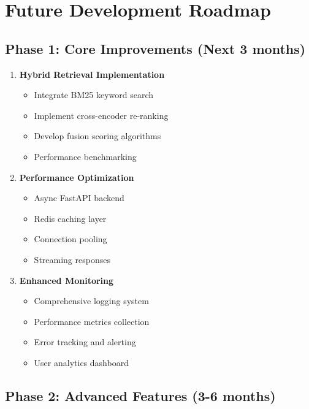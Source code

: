 \documentclass[12pt,a4paper]{article}
\begin{document}
\section{Future Development Roadmap}

\subsection{Phase 1: Core Improvements (Next 3 months)}

\begin{enumerate}
    \item \textbf{Hybrid Retrieval Implementation}
    \begin{itemize}
        \item Integrate BM25 keyword search
        \item Implement cross-encoder re-ranking
        \item Develop fusion scoring algorithms
        \item Performance benchmarking
    \end{itemize}
    
    \item \textbf{Performance Optimization}
    \begin{itemize}
        \item Async FastAPI backend
        \item Redis caching layer
        \item Connection pooling
        \item Streaming responses
    \end{itemize}
    
    \item \textbf{Enhanced Monitoring}
    \begin{itemize}
        \item Comprehensive logging system
        \item Performance metrics collection
        \item Error tracking and alerting
        \item User analytics dashboard
    \end{itemize}
\end{enumerate}

\subsection{Phase 2: Advanced Features (3-6 months)}
\end{document}
